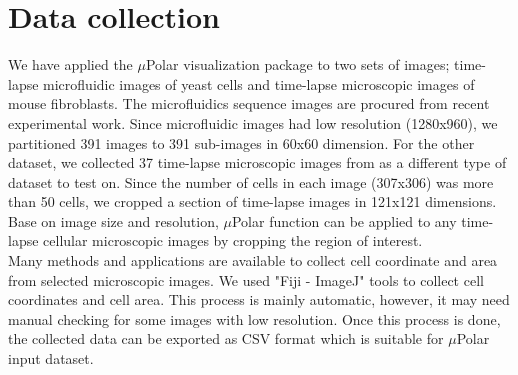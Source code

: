 \documentclass[conference]{IEEEtran}
\begin{document}


\section{Data collection}
 
We have applied the $\mu$Polar visualization package to two sets of images; time-lapse microfluidic images of yeast cells and time-lapse microscopic images of mouse fibroblasts. The microfluidics sequence images are procured from \cite{ref13} recent experimental work. Since microfluidic images had low resolution (1280x960), we partitioned 391 images to 391 sub-images in 60x60 dimension. For the other dataset, we collected 37 time-lapse microscopic images from \cite{ref05} as a different type of dataset to test on. Since the number of cells in each image (307x306) was more than 50 cells, we cropped a section of time-lapse images in 121x121 dimensions. Base on image size and resolution, $\mu$Polar function can be applied to any time-lapse cellular microscopic images by cropping the region of interest.
\\

Many methods and applications are available to collect cell coordinate and area from selected microscopic images. We used "Fiji - ImageJ" tools to collect cell coordinates and cell area. This process is mainly automatic, however, it may need manual checking for some images with low resolution. Once this process is done, the collected data can be exported as CSV format which is suitable for $\mu$Polar input dataset.  
\\



\end{document}
